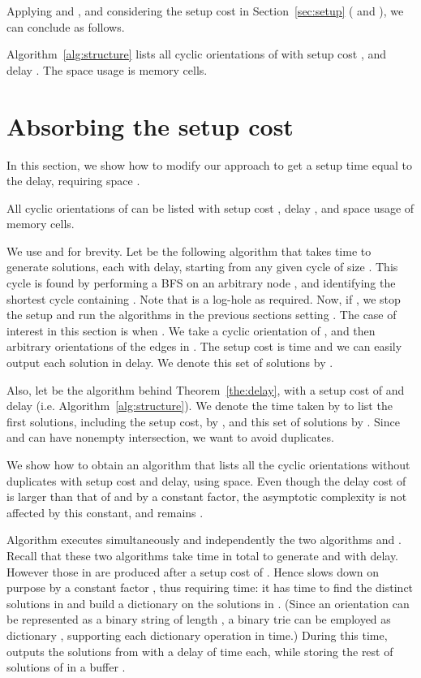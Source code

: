 \documentclass{llncs}
\newcommand{\loghole}{log-hole\xspace}
\begin{document}
Applying  and , and considering the setup cost in Section~\ref{sec:setup} ( and ), we can conclude as follows.

\begin{theorem}
\label{the:delay}
Algorithm~\ref{alg:structure} lists all cyclic orientations of  with setup cost ,
and delay . The space usage is  memory cells.
\end{theorem}


\section{Absorbing the setup cost}
\label{sec:absorb}

In this section, we show how to modify our approach to get a setup time equal to the delay, requiring space .

\begin{theorem}
\label{the:absorb}
All cyclic orientations of  can be listed with setup cost , delay , and space usage of  memory cells.
\end{theorem}

We use  and  for brevity.  Let  be the
following algorithm that takes  time to generate 
solutions, each with  delay, starting from any given
cycle of size . This cycle is found by performing a BFS
on an arbitrary node , and identifying the shortest cycle 
containing . Note that  is a \loghole as required. Now, if
, we stop the setup and run the algorithms in the
previous sections setting . The case of interest in this
section is when . We take a cyclic orientation
 of , and then  arbitrary orientations of the edges
in .  The setup cost is  time and we can easily
output each solution in  delay. We denote this set of
 solutions by .

Also, let  be the algorithm behind Theorem~\ref{the:delay}, with a setup cost of  and   delay (i.e. Algorithm~\ref{alg:structure}). We denote the time taken by  to list the first  solutions, including the  setup cost, by , and this set of  solutions by . Since  and  can have nonempty intersection, we want to avoid duplicates. 

We show how to obtain an algorithm  that lists all the cyclic orientations without duplicates with  setup cost and delay, using  space. Even though the delay cost of  is larger than that of  and  by a constant factor, the asymptotic complexity is not affected by this constant, and remains . 

Algorithm  executes simultaneously and independently the two algorithms  and . Recall that these two algorithms take  time in total to generate  and  with   delay. However those in  are produced after a setup cost of .  Hence  slows down on purpose by a constant factor , thus requiring  time: it has time to find the distinct solutions in  and build a dictionary  on the solutions in . (Since an orientation can be represented as a binary string of length , a binary trie can be employed as dictionary , supporting each dictionary operation in  time.) During this time,  outputs the  solutions from  with a delay of  time each, while storing the rest of solutions of  in a buffer . 
\end{document}
